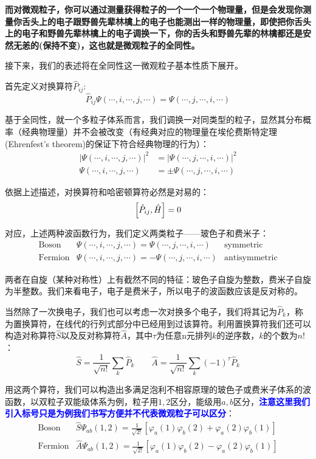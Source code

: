 \textbf{而对微观粒子，你可以通过测量获得粒子的一个一个一个物理量，但是会发现你测量你舌头上的电子跟野兽先辈林檎上的电子也能测出一样的物理量，即使把你舌头上的电子和野兽先辈林檎上的电子调换一下，你的舌头和野兽先辈的林檎都还是安然无恙的(保持不变)，这也就是微观粒子的全同性。}

接下来，我们的表述将在全同性这一微观粒子基本性质下展开。

首先定义对换算符$\hat{P}_{ij}$:
\[\hat{P}_{ij}\varPsi(\cdots,i,\cdots,j,\cdots)=\varPsi(\cdots,j,\cdots,i,\cdots)\]

基于全同性，就一个多粒子体系而言，我们调换一对同类型的粒子，显然其分布概率（经典物理量）并不会被改变（有经典对应的物理量在埃伦费斯特定理(Ehrenfest's theorem)的保证下符合经典物理的行为）：
\[\begin{aligned}
|\varPsi(\cdots,i,\cdots,j,\cdots)|^2&=|\varPsi(\cdots,j,\cdots,i,\cdots)|^2 \\ 
\varPsi(\cdots,i,\cdots,j,\cdots)&=\pm\varPsi(\cdots,j,\cdots,i,\cdots)
\end{aligned}\]

依据上述描述，对换算符和哈密顿算符必然是对易的：
\[\qty[\hat{P}_{ij},\hat{H}]=0\]

对应，上述两种波函数行为，我们定义两类粒子——玻色子和费米子：
\[
    \begin{array}{lll}
        \text{Boson} & \varPsi(\cdots,i,\cdots,j,\cdots)=\varPsi(\cdots,j,\cdots,i,\cdots) & \text{symmetric} \\
        \text{Fermion} & \varPsi(\cdots,i,\cdots,j,\cdots)=-\varPsi(\cdots,j,\cdots,i,\cdots) & \text{antisymmetric}
    \end{array}
\]

两者在自旋（某种对称性）上有截然不同的特征：玻色子自旋为整数，费米子自旋为半整数。我们来看电子，电子是费米子，所以电子的波函数应该是反对称的。

当然除了一次换电子，我们也可以考虑一次对换多个电子，我们将其记为$\hat{P}_k$，称为置换算符，在线代的行列式部分中已经用到过该算符。利用置换算符我们还可以构造对称算符$\hat{S}$以及反对称算符$\hat{A}$，其中$\tau$为任意n元排列$k$的逆序数，$k$的个数为$n!$：
\[\hat{S}=\frac{1}{\sqrt{n!}}\sum_{k}\hat{P}_{k} \qquad \hat{A}=\frac{1}{\sqrt{n!}}\sum_{k}(-1)^{\tau}\hat{P}_{k}\]

用这两个算符，我们可以构造出多满足泡利不相容原理的玻色子或费米子体系的波函数，以双粒子双能级体系为例，粒子用$1,2$区分，能级用$a,b$区分，\textcolor{blue}{\textbf{注意这里我们引入标号只是为例我们书写方便并不代表微观粒子可以区分}}：
\[\begin{array}{ll}
\text{Boson} & \hat{S}\varPsi_{ab}(1,2)=\frac{1}{\sqrt{2!}}[\varphi_a(1)\varphi_b(2)+\varphi_a(2)\varphi_b(1)]\\
\text{Fermion} & \hat{A}\varPsi_{ab}(1,2)=\frac{1}{\sqrt{2!}}[\varphi_a(1)\varphi_b(2)-\varphi_a(2)\varphi_b(1)] 
\end{array}\]

